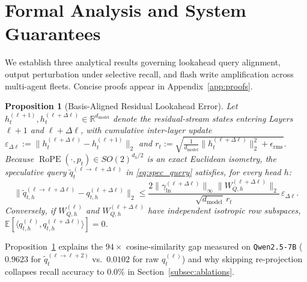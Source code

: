 \documentclass[10pt,journal,compsoc]{IEEEtran}
\newtheorem{proposition}{Proposition}
\theoremstyle{definition}
\theoremstyle{remark}
\newcommand{\RoPE}{\operatorname{RoPE}}
\newcommand{\R}{\mathbb{R}}
\newcommand{\E}{\mathbb{E}}
\begin{document}
\section{Formal Analysis and System Guarantees}\label{sec:theory}

We establish three analytical results governing lookahead query alignment, output perturbation under selective recall, and flash write amplification across multi-agent fleets. Concise proofs appear in Appendix~\ref{app:proofs}.

\begin{proposition}[Basis-Aligned Residual Lookahead Error]\label{prop:lookahead}
Let $h_t^{(\ell+1)}, h_t^{(\ell+\Delta\ell)} \in \R^{d_{\mathrm{model}}}$ denote the residual-stream states entering Layers~$\ell+1$ and $\ell+\Delta\ell$, with cumulative inter-layer update $\varepsilon_{\Delta\ell} := \|h_t^{(\ell+\Delta\ell)} - h_t^{(\ell+1)}\|_2$ and $r_t := \sqrt{\frac{1}{d_{\mathrm{model}}}\|h_t^{(\ell+\Delta\ell)}\|_2^2 + \epsilon_{\mathrm{rms}}}$. Because $\RoPE(\cdot, p_t) \in SO(2)^{d_h/2}$ is an exact Euclidean isometry, the speculative query $\tilde{q}_t^{(\ell \to \ell+\Delta\ell)}$ in \eqref{eq:spec_query} satisfies, for every head $h$:
\begin{equation}\label{eq:prop1}
\big\|\tilde{q}_{t,h}^{(\ell \to \ell+\Delta\ell)} - q_{t,h}^{(\ell+\Delta\ell)}\big\|_2 \le \frac{2\|\gamma_{\mathrm{ln}}^{(\ell+\Delta\ell)}\|_\infty \|W_{Q,h}^{(\ell+\Delta\ell)}\|_2}{\sqrt{d_{\mathrm{model}}}\, r_t}\,\varepsilon_{\Delta\ell}.
\end{equation}
Conversely, if $W_{Q,h}^{(\ell)}$ and $W_{Q,h}^{(\ell+\Delta\ell)}$ have independent isotropic row subspaces, $\E[\langle q_{t,h}^{(\ell)}, q_{t,h}^{(\ell+\Delta\ell)}\rangle] = 0$.
\end{proposition}

Proposition~\ref{prop:lookahead} explains the $94\times$ cosine-similarity gap measured on \texttt{Qwen2.5-7B} ($0.9623$ for $\tilde{q}_t^{(\ell\to\ell+2)}$ vs.\ $0.0102$ for raw $q_t^{(\ell)}$) and why skipping re-projection collapses recall accuracy to $0.0\%$ in Section~\ref{subsec:ablations}.
\end{document}
